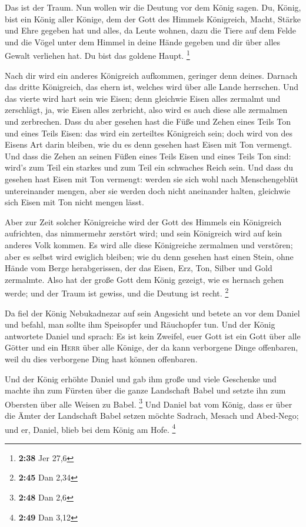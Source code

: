  Das ist der Traum. Nun wollen wir die Deutung vor dem
König sagen.  Du, König, bist ein König aller Könige, dem
der Gott des Himmels Königreich, Macht, Stärke und Ehre gegeben hat
 und alles, da Leute wohnen, dazu die Tiere auf dem Felde
und die Vögel unter dem Himmel in deine Hände gegeben und dir über alles
Gewalt verliehen hat. Du bist das goldene Haupt. \footnote{\textbf{2:38}
  Jer 27,6}

 Nach dir wird ein anderes Königreich aufkommen, geringer
denn deines. Darnach das dritte Königreich, das ehern ist, welches wird
über alle Lande herrschen.  Und das vierte wird hart sein
wie Eisen; denn gleichwie Eisen alles zermalmt und zerschlägt, ja, wie
Eisen alles zerbricht, also wird es auch diese alle zermalmen und
zerbrechen.  Dass du aber gesehen hast die Füße und Zehen
eines Teils Ton und eines Teils Eisen: das wird ein zerteiltes
Königreich sein; doch wird von des Eisens Art darin bleiben, wie du es
denn gesehen hast Eisen mit Ton vermengt.  Und dass die
Zehen an seinen Füßen eines Teils Eisen und eines Teils Ton sind: wird's
zum Teil ein starkes und zum Teil ein schwaches Reich sein.
 Und dass du gesehen hast Eisen mit Ton vermengt: werden
sie sich wohl nach Menschengeblüt untereinander mengen, aber sie werden
doch nicht aneinander halten, gleichwie sich Eisen mit Ton nicht mengen
lässt.

 Aber zur Zeit solcher Königreiche wird der Gott des
Himmels ein Königreich aufrichten, das nimmermehr zerstört wird; und
sein Königreich wird auf kein anderes Volk kommen. Es wird alle diese
Königreiche zermalmen und verstören; aber es selbst wird ewiglich
bleiben;  wie du denn gesehen hast einen Stein, ohne
Hände vom Berge herabgerissen, der das Eisen, Erz, Ton, Silber und Gold
zermalmte. Also hat der große Gott dem König gezeigt, wie es hernach
gehen werde; und der Traum ist gewiss, und die Deutung ist recht.
\footnote{\textbf{2:45} Dan 2,34}

 Da fiel der König Nebukadnezar auf sein Angesicht und
betete an vor dem Daniel und befahl, man sollte ihm Speisopfer und
Räuchopfer tun.  Und der König antwortete Daniel und
sprach: Es ist kein Zweifel, euer Gott ist ein Gott über alle Götter und
ein \textsc{Herr} über alle Könige, der da kann verborgene Dinge
offenbaren, weil du dies verborgene Ding hast können offenbaren.

 Und der König erhöhte Daniel und gab ihm große und viele
Geschenke und machte ihn zum Fürsten über die ganze Landschaft Babel und
setzte ihn zum Obersten über alle Weisen zu Babel. \footnote{\textbf{2:48}
  Dan 2,6}  Und Daniel bat vom König, dass er über die
Ämter der Landschaft Babel setzen möchte Sadrach, Mesach und Abed-Nego;
und er, Daniel, blieb bei dem König am Hofe. \footnote{\textbf{2:49} Dan
  3,12}


